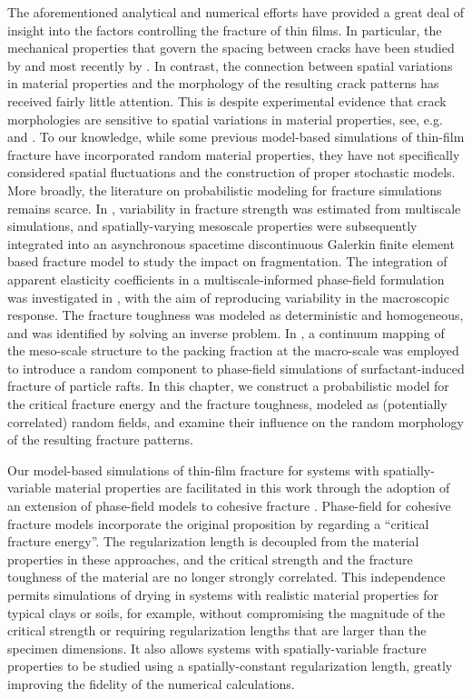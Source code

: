 The aforementioned analytical and numerical efforts have provided a great deal of insight into the factors controlling the fracture of thin films.  In particular, the mechanical properties that govern the spacing between cracks have been studied by \citet{hutchinson1991mixed, xia2000crack} and most recently by \citet{yin2008explicit}. In contrast,  the connection between spatial variations in material properties and the morphology of the resulting crack patterns has received fairly little attention. This is despite experimental evidence that crack morphologies are sensitive to spatial variations in material properties, see, e.g. \citet{kitsunezaki2016shaking, kitsunezaki2017stress, halasz2017effect, kitsunezaki2017memory} and \citet{nakahara2018mechanism}. To our knowledge, while some previous model-based simulations of thin-film fracture have incorporated random material properties, they have not specifically considered spatial fluctuations and the construction of proper stochastic models. More broadly, the literature on probabilistic modeling for fracture simulations remains scarce. In \cite{Acton2018}, variability in fracture strength was estimated from multiscale simulations, and spatially-varying mesoscale properties were subsequently integrated into an asynchronous spacetime discontinuous Galerkin finite element based fracture model to study the impact on fragmentation. The integration of apparent elasticity coefficients in a multiscale-informed phase-field formulation was investigated in \cite{Hun2019}, with the aim of reproducing variability in the macroscopic response. The fracture toughness was modeled as deterministic and homogeneous, and was identified by solving an inverse problem. In \cite{Peco2019}, a continuum mapping of the meso-scale structure to the packing fraction at the macro-scale was employed to introduce a random component to phase-field simulations of surfactant-induced fracture of particle rafts. In this chapter, we construct a probabilistic model for the critical fracture energy and the fracture toughness, modeled as (potentially correlated) random fields, and examine their influence on the random morphology of the resulting fracture patterns.

Our model-based simulations of thin-film fracture for systems with spatially-variable material properties are facilitated in this work through the adoption of an extension of phase-field models to cohesive fracture \cite{wu2016thermodynamically, wu2017unified, geelen2019phase}. Phase-field for cohesive fracture models incorporate the original proposition by \citet{xia2000crack} regarding a ``critical fracture energy''. The regularization length is decoupled from the material properties in these approaches, and the critical strength and the fracture toughness of the material are no longer strongly correlated. This independence permits simulations of drying in systems with realistic material properties for typical clays or soils, for example, without compromising the magnitude of the critical strength or requiring  regularization lengths that are larger than the specimen dimensions.  It also allows systems with spatially-variable fracture properties to be studied using a spatially-constant regularization length,  greatly improving the fidelity of the numerical calculations.

